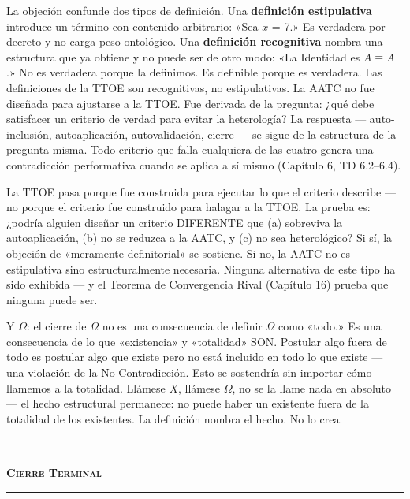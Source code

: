\documentclass[10pt, openany, oneside]{book}
\renewcommand{\normalsize}{\fontsize{10}{13}\selectfont}
\begin{document}
La objeción confunde dos tipos de definición. Una \textbf{definición estipulativa} introduce un término con contenido arbitrario: «Sea $x$ = 7.» Es verdadera por decreto y no carga peso ontológico. Una \textbf{definición recognitiva} nombra una estructura que ya obtiene y no puede ser de otro modo: «La Identidad es $A \equiv A$.» No es verdadera porque la definimos. Es definible porque es verdadera. Las definiciones de la TTOE son recognitivas, no estipulativas. La AATC no fue diseñada para ajustarse a la TTOE. Fue derivada de la pregunta: ¿qué debe satisfacer un criterio de verdad para evitar la heterología? La respuesta --- auto-inclusión, autoaplicación, autovalidación, cierre --- se sigue de la estructura de la pregunta misma. Todo criterio que falla cualquiera de las cuatro genera una contradicción performativa cuando se aplica a sí mismo (Capítulo 6, TD 6.2--6.4).

La TTOE pasa porque fue construida para ejecutar lo que el criterio describe --- no porque el criterio fue construido para halagar a la TTOE. La prueba es: ¿podría alguien diseñar un criterio DIFERENTE que (a) sobreviva la autoaplicación, (b) no se reduzca a la AATC, y (c) no sea heterológico? Si sí, la objeción de «meramente definitorial» se sostiene. Si no, la AATC no es estipulativa sino estructuralmente necesaria. Ninguna alternativa de este tipo ha sido exhibida --- y el Teorema de Convergencia Rival (Capítulo 16) prueba que ninguna puede ser.

Y $\Omega$: el cierre de $\Omega$ no es una consecuencia de definir $\Omega$ como «todo.» Es una consecuencia de lo que «existencia» y «totalidad» SON. Postular algo fuera de todo es postular algo que existe pero no está incluido en todo lo que existe --- una violación de la No-Contradicción. Esto se sostendría sin importar cómo llamemos a la totalidad. Llámese $X$, llámese $\Omega$, no se la llame nada en absoluto --- el hecho estructural permanece: no puede haber un existente fuera de la totalidad de los existentes. La definición nombra el hecho. No lo crea.

\vspace{1.5em}


\begin{center}
    \rule{0.3\textwidth}{0.4pt}\\[0.5em]
    {\normalsize\bfseries\scshape Cierre Terminal}\\[0.3em]
    \rule{0.3\textwidth}{0.4pt}
\end{center}
\end{document}
